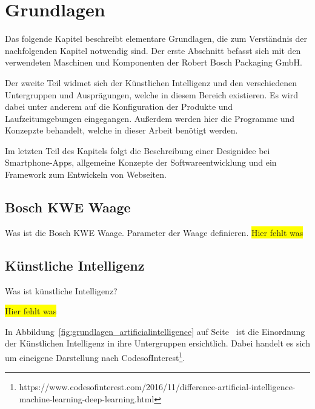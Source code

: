 \chapter{Grundlagen}
\label{ch:grundlagen}
Das folgende Kapitel beschreibt elementare Grundlagen, die zum Verständnis der nachfolgenden Kapitel notwendig sind. Der
erste Abschnitt befasst sich mit den verwendeten Maschinen und Komponenten der Robert Bosch Packaging GmbH.

Der zweite Teil widmet sich der Künstlichen Intelligenz und den verschiedenen Untergruppen und Ausprägungen, welche in
diesem Bereich existieren. Es wird dabei unter anderem auf die Konfiguration der Produkte und Laufzeitumgebungen
eingegangen. Außerdem werden hier die Programme und Konzepzte behandelt, welche in dieser Arbeit benötigt werden.

Im letzten Teil des Kapitels folgt die Beschreibung einer Designidee bei Smartphone-Apps, allgemeine Konzepte der
Softwareentwicklung und ein Framework zum Entwickeln von Webseiten.

\section{Bosch KWE Waage}
Was ist die Bosch KWE Waage. Parameter der Waage definieren.
\colorbox{yellow}{Hier fehlt was}

\section{Künstliche Intelligenz}
Was ist künstliche Intelligenz?

\colorbox{yellow}{Hier fehlt was}

In Abbildung~\ref{fig:grundlagen_artificialintelligence} auf Seite~\pageref{fig:grundlagen_artificialintelligence} ist
die Einordnung der Künstlichen Intelligenz in ihre Untergruppen ersichtlich. Dabei handelt es sich um eineigene Darstellung
nach CodesofInterest\footnote{https://www.codesofinterest.com/2016/11/difference-artificial-intelligence-machine-learning-deep-learning.html}.

